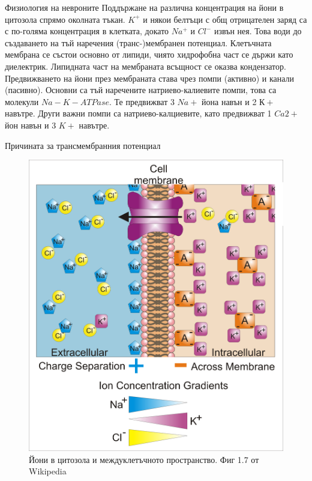 \begin{frame}[t]{Физиология на невроните}
  Поддържане на различна концентрация на йони в цитозола спрямо околната тъкан.
  $K^{+}$ и някои белтъци с общ отрицателен заряд са с по-голяма концентрация в клетката,
  докато $Na^{+}$ и $Cl^{-}$ извън нея. Това води до създаването на тъй наречения (транс-)мембранен потенциал.
  Клетъчната мембрана се състои основно от липиди, чиято хидрофобна част се държи като диелектрик.
  Липидната част на мембраната всъщност се оказва кондензатор. 
  Предвижването на йони през мембраната става чрез помпи (активно) и канали (пасивно). 
  Основни са тъй наречените натриево-калиевите помпи, това са молекули $Na-K-ATPase$. Те предвижват 3 $Na{+}$ йона навън и 2 $К{+}$ навътре. 
  Други важни помпи са натриево-калциевите, като предвижват 1 $Ca{2+}$ йон навън и 3 $K{+}$ навътре.
\end{frame}

\begin{frame}[t]{Причината за трансмембранния потенциал}
  \begin{figure}[htbp!]
    \centering
    \includegraphics[width=\textwidth,height=0.7\textheight,keepaspectratio]{membrane-potential.png}
    \caption{Йони в цитозола и междуклетъчното пространство. Фиг 1.7 от Wikipedia}
  \end{figure}
\end{frame}

